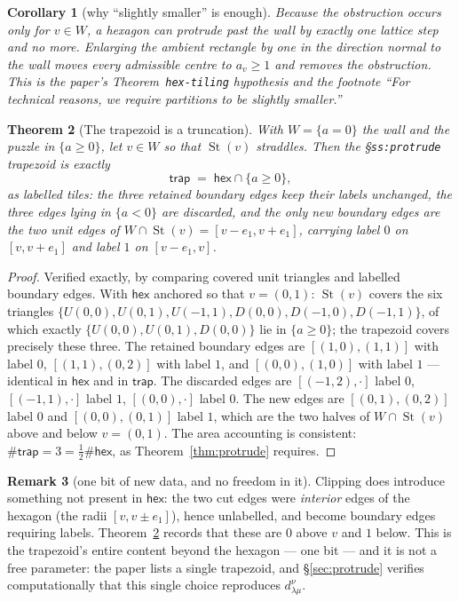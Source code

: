 \documentclass[11pt]{article}
\newtheorem{theorem}{Theorem}
\newtheorem{corollary}[theorem]{Corollary}
\theoremstyle{definition}
\newtheorem{remark}[theorem]{Remark}
\newcommand{\hex}{\mathsf{hex}}
\newcommand{\trap}{\mathsf{trap}}
\newcommand{\la}{\lambda}
\newcommand{\Star}{\operatorname{St}}
\newcommand{\dd}{d^{\nu}_{\la\mu}}
\begin{document}
\begin{corollary}[why ``slightly smaller'' is enough]
Because the obstruction occurs only for $v\in W$, a hexagon can protrude past
the wall by exactly one lattice step and no more. Enlarging the ambient
rectangle by one in the direction normal to the wall moves every admissible
centre to $a_v\ge1$ and removes the obstruction. This is the paper's
Theorem~\texttt{hex-tiling} hypothesis and the footnote ``For technical
reasons, we require partitions to be slightly smaller.''
\end{corollary}

\begin{theorem}[The trapezoid is a truncation]\label{thm:trunc}
With $W=\{a=0\}$ the wall and the puzzle in $\{a\ge0\}$, let $v\in W$ so that
$\Star(v)$ straddles. Then the \S\texttt{ss:protrude} trapezoid is exactly
\[
 \trap \;=\; \hex \cap \{a\ge 0\},
\]
as labelled tiles: the three retained boundary edges keep their labels
unchanged, the three edges lying in $\{a<0\}$ are discarded, and the only new
boundary edges are the two unit edges of $W\cap\Star(v)=[v-e_1,v+e_1]$, carrying
label $0$ on $[v,v+e_1]$ and label $1$ on $[v-e_1,v]$.
\end{theorem}

\begin{proof}
Verified exactly, by comparing covered unit triangles and labelled boundary
edges. With $\hex$ anchored so that $v=(0,1)$: $\Star(v)$ covers the six
triangles $\{U(0,0),U(0,1),U(-1,1),D(0,0),D(-1,0),D(-1,1)\}$, of which exactly
$\{U(0,0),U(0,1),D(0,0)\}$ lie in $\{a\ge0\}$; the trapezoid covers precisely
these three. The retained boundary edges are
$[(1,0),(1,1)]$ with label $0$, $[(1,1),(0,2)]$ with label $1$, and
$[(0,0),(1,0)]$ with label $1$ --- identical in $\hex$ and in $\trap$. The
discarded edges are $[(-1,2),\cdot]$ label $0$, $[(-1,1),\cdot]$ label $1$,
$[(0,0),\cdot]$ label $0$. The new edges are $[(0,1),(0,2)]$ label $0$ and
$[(0,0),(0,1)]$ label $1$, which are the two halves of $W\cap\Star(v)$ above and
below $v=(0,1)$. The area accounting is consistent:
$\#\trap = 3 = \tfrac12\#\hex$, as Theorem~\ref{thm:protrude} requires.
\end{proof}

\begin{remark}[one bit of new data, and no freedom in it]\label{rem:onebit}
Clipping does introduce something not present in $\hex$: the two cut edges were
\emph{interior} edges of the hexagon (the radii $[v,v\pm e_1]$), hence
unlabelled, and become boundary edges requiring labels. Theorem~\ref{thm:trunc}
records that these are $0$ above $v$ and $1$ below. This is the trapezoid's
entire content beyond the hexagon --- one bit --- and it is not a free
parameter: the paper lists a single trapezoid, and \S\ref{sec:protrude} verifies
computationally that this single choice reproduces $\dd$.
\end{remark}
\end{document}
